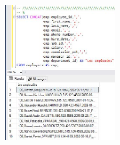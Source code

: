 \begin{itemize}
	\begin{center}
	\includegraphics[width=5cm]{./Imagenes/actividad0303} 
	\end{center}
\end{itemize}


